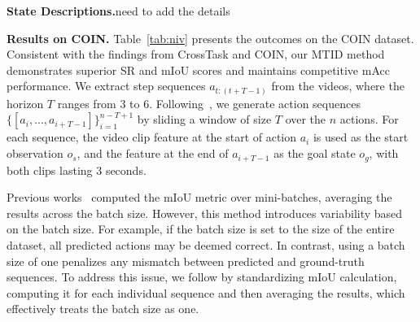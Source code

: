 \textbf{State Descriptions.}need to add the details

\textbf{Results on COIN.}
Table~\ref{tab:niv} presents the outcomes on the COIN dataset. Consistent with the findings from CrossTask and COIN, our MTID method demonstrates superior SR and mIoU scores and maintains competitive mAcc performance.
We extract step sequences $a_{t:(t+T-1)}$ from the videos, where the horizon $T$ ranges from 3 to 6. Following~\citep{zhao2022p3iv,wang2023pdpp}, we generate action sequences $\{[a_i, ..., a_{i+T-1}]\}_{i=1}^{n-T+1}$ by sliding a window of size $T$ over the $n$ actions. For each sequence, the video clip feature at the start of action $a_i$ is used as the start observation $o_s$, and the feature at the end of $a_{i+T-1}$ as the goal state $o_g$, with both clips lasting 3 seconds.

Previous works~\citep{chang2020procedure, bi2021procedure, sun2022plate} computed the mIoU metric over mini-batches, averaging the results across the batch size. However, this method introduces variability based on the batch size. For example, if the batch size is set to the size of the entire dataset, all predicted actions may be deemed correct. In contrast, using a batch size of one penalizes any mismatch between predicted and ground-truth sequences. To address this issue, we follow \citet{wang2023pdpp} by standardizing mIoU calculation, computing it for each individual sequence and then averaging the results, which effectively treats the batch size as one.

